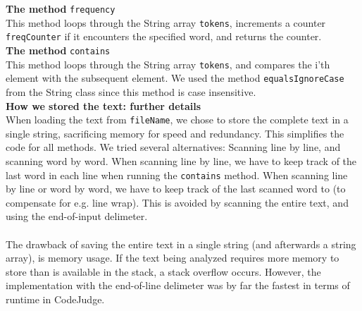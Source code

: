 \textbf{The method} \texttt{frequency}\\
This method loops through the String array \texttt{tokens}, increments a counter \texttt{freqCounter} if it encounters the specified word, and returns the counter.\\

\textbf{The method} \texttt{contains}\\
This method loops through the String array \texttt{tokens}, and compares the i'th element with the subsequent element. We used the method \texttt{equalsIgnoreCase} from the String class since this method is case insensitive. \\

\textbf{How we stored the text: further details}\\
When loading the text from \texttt{fileName}, we chose to store the complete text in a single string, sacrificing memory for speed and redundancy. This simplifies the code for all methods. We tried several alternatives: Scanning line by line, and scanning word by word. When scanning line by line, we have to keep track of the last word in each line when running the \texttt{contains} method. When scanning line by line or word by word, we have to keep track of the last scanned word to (to compensate for e.g. line wrap). This is avoided by scanning the entire text, and using the end-of-input delimeter.\\
\\
The drawback of saving the entire text in a single string (and afterwards a string array), is memory usage. If the text being analyzed requires more memory to store than is available in the stack, a stack overflow occurs. However, the implementation with the end-of-line delimeter was by far the fastest in terms of runtime in  CodeJudge.


